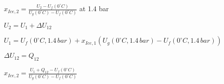\( x_{Ice,2} = \frac{U_2 - U_f(0^\circ C)}{U_g(0^\circ C) - U_f(0^\circ C)} \) at 1.4 bar  

\( U_2 = U_1 + \Delta U_{12} \)  

\( U_1 = U_f(0^\circ C, 1.4 \, bar) + x_{Ice,1} \left( U_g(0^\circ C, 1.4 \, bar) - U_f(0^\circ C, 1.4 \, bar) \right) \)  

\( \Delta U_{12} = Q_{12} \)  

\( x_{Ice,2} = \frac{U_1 + Q_{12} - U_f(0^\circ C)}{U_g(0^\circ C) - U_f(0^\circ C)} \)